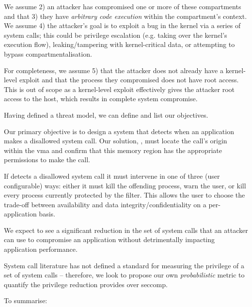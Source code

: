 We assume 2) an attacker has compromised one or more of these compartments and that
3) they have \textit{arbitrary code execution} within the compartment's context. We
assume 4) the attacker's goal is to exploit a bug in the kernel via a series of
system calls; this could be privilege escalation (e.g. taking over the kernel's
execution flow), leaking/tampering with kernel-critical data, or attempting to
bypass compartmentalisation. 

For completeness, we assume 5) that the attacker does not already have a 
kernel-level exploit and that the process they compromised does not have root
access. This is out of scope as a kernel-level exploit effectively gives the
attacker root access to the host, which results in complete system compromise.



Having defined a threat model, we can define and list our objectives.

Our primary objective is to design a system that detects when an application
makes a disallowed system call. Our solution, \af,  must locate the call's origin
within the \ac{vma} and confirm that this memory region has the
appropriate permissions to make the call.

If \af detects a disallowed system call it must intervene in one of three (user
configurable) ways: either it must kill the offending process, warn the user, or
kill every process currently protected by the filter. This allows the user to
choose the trade-off between availability and data integrity/confidentiality on
a per-application basis.

We expect to see a significant reduction in the set of system calls that an
attacker can use to compromise an application without detrimentally impacting
application performance. 

System call literature has not defined a standard for measuring the privilege
of a set of system calls -- therefore, we look to propose our own
\textit{probabilistic} metric to quantify the privilege reduction \af
provides over seccomp.

To summarise:

